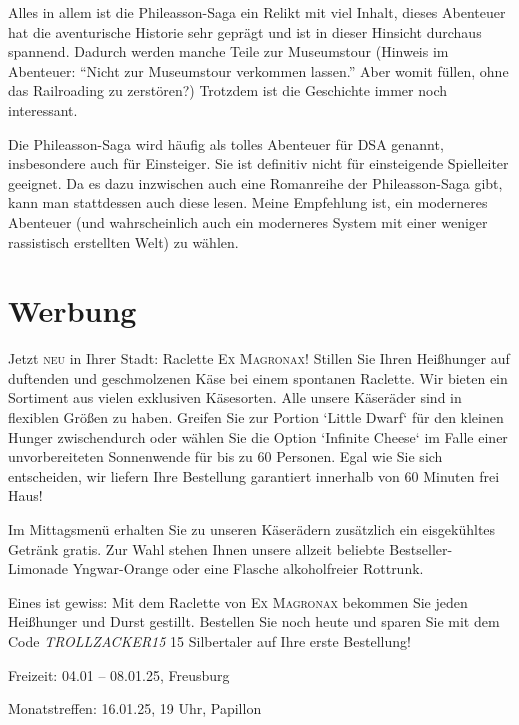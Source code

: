 \documentclass[final]{multiversum}
\begin{document}
Alles in allem ist die Phileasson-Saga ein Relikt mit viel Inhalt, dieses
Abenteuer hat die aventurische Historie sehr geprägt und ist in dieser Hinsicht
durchaus spannend. Dadurch werden manche Teile zur Museumstour (Hinweis im
Abenteuer: “Nicht zur Museumstour verkommen lassen.” Aber womit füllen, ohne das
Railroading zu zerstören?) Trotzdem ist die Geschichte immer noch interessant.

Die Phileasson-Saga wird häufig als tolles Abenteuer für DSA genannt,
insbesondere auch für Einsteiger. Sie ist definitiv nicht für einsteigende
Spielleiter geeignet. Da es dazu inzwischen auch eine Romanreihe der
Phileasson-Saga gibt, kann man stattdessen auch diese lesen. Meine Empfehlung
ist, ein moderneres Abenteuer (und wahrscheinlich auch ein moderneres System mit
einer weniger rassistisch erstellten Welt) zu wählen.

\section{Werbung}
Jetzt \textsc{neu} in Ihrer Stadt: Raclette \textsc{Ex Magronax}! Stillen Sie Ihren
Heißhunger auf duftenden und geschmolzenen Käse bei einem spontanen Raclette.
Wir bieten ein Sortiment aus vielen exklusiven Käsesorten.
Alle unsere Käseräder sind in flexiblen Größen zu haben. Greifen Sie zur Portion
`Little Dwarf` für den kleinen Hunger zwischendurch oder wählen Sie die Option
`Infinite Cheese` im Falle einer unvorbereiteten Sonnenwende für bis zu 60
Personen. Egal wie Sie sich entscheiden, wir liefern Ihre Bestellung garantiert
innerhalb von 60 Minuten frei Haus!

Im Mittagsmenü erhalten Sie zu unseren Käserädern zusätzlich ein eisgekühltes Getränk
gratis. Zur Wahl stehen Ihnen unsere allzeit beliebte Bestseller-Limonade
Yngwar-Orange oder eine Flasche alkoholfreier Rottrunk.

Eines ist gewiss: Mit dem Raclette von \textsc{Ex Magronax} bekommen Sie jeden
Heißhunger und Durst gestillt. Bestellen Sie noch heute und sparen Sie mit dem Code 
\emph{TROLLZACKER15} 15 Silbertaler auf Ihre erste Bestellung!
\begin{termine}
  \item Freizeit: 04.01 -- 08.01.25, Freusburg
  \item Monatstreffen: 16.01.25, 19 Uhr, Papillon
\end{termine}
\impressum
\end{document}
